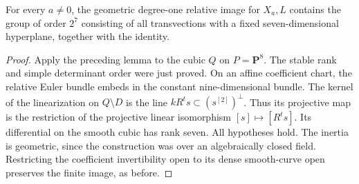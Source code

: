 \begin{corollary}
\label{cor:mixed-every-modulus-full-root-inertia-candidate}
For every $a\ne0$, the geometric degree-one relative image for
$X_a,L$ contains the group of order $2^7$ consisting of all
transvections with a fixed seven-dimensional hyperplane, together
with the identity.
\end{corollary}
\begin{proof}
Apply the preceding lemma to the cubic $Q$ on $P=\mathbf P^8$.
The stable rank and simple determinant order were just proved.
On an affine coefficient chart, the relative Euler bundle embeds
in the constant nine-dimensional bundle. The kernel of the
linearization on $Q\setminus D$ is the line
$kR^ts\subset (s^{[2]})^\perp$. Thus its projective map is
the restriction of the projective linear isomorphism
$[s]\mapsto[R^ts]$. Its differential on the smooth cubic has
rank seven. All hypotheses hold. The inertia is geometric,
since the construction was over an algebraically closed field.
Restricting the coefficient invertibility open to its dense
smooth-curve open preserves the finite image, as before.
\end{proof}

